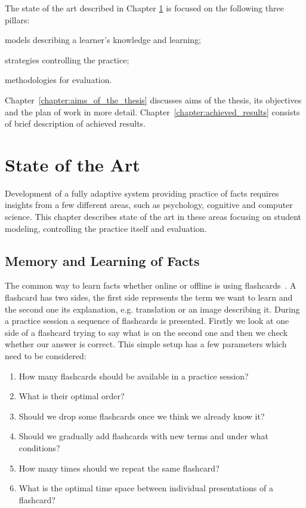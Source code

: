 \documentclass[table,color,cover,twoside,nolot,nolof]{fithesis3/fithesis3}
\begin{document}
The state of the art described in Chapter
\ref{chapter:state_of_the_art} is focused on the following three pillars:
\begin{enumerate*}[label=(\arabic*)]
	\item models describing a learner's knowledge and learning;
	\item strategies controlling the practice;
	\item methodologies for evaluation.
\end{enumerate*}
Chapter~\ref{chapter:aims_of_the_thesis} discusses aims of the thesis, its
objectives and the plan of work in more detail.
Chapter~\ref{chapter:achieved_results} consists of brief description of
achieved results.

\chapter{State of the Art}
\label{chapter:state_of_the_art}

Development of a fully adaptive system providing practice of facts requires
insights from a few different areas, such as psychology, cognitive and computer
science. This chapter describes state of the art in these areas focusing on student
modeling, controlling the practice itself and evaluation.

\section{Memory and Learning of Facts}
\label{section:models}

The common way to learn facts whether online or offline is using
flashcards~\cite{kornell2008optimising}. A flashcard has two sides, the first
side represents the term we want to learn and the second one its
explanation, e.g. translation or an image describing it. During a practice
session a sequence of flashcards is presented. Firstly we look at one side of a
flashcard trying to say what is on the second one and then we check whether our
answer is correct. This simple setup has a few parameters which need to be
considered:

\begin{enumerate}
	\item How many flashcards should be available in a practice session?
	\item What is their optimal order?
	\item Should we drop some flashcards once we think we already know it?
	\item Should we gradually add flashcards with new terms and under what conditions?
	\item How many times should we repeat the same flashcard?
	\item What is the optimal time space between individual presentations of a flashcard?
\end{enumerate}
\end{document}
